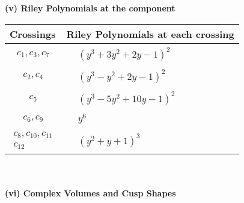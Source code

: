 \documentclass[1p]{elsarticle_modified}
\theoremstyle{definition}
\begin{document}
\newpage\renewcommand{\arraystretch}{1}
\flushleft \textbf{(v) Riley Polynomials at the component}\newline \\
\begin{tabular}{m{50pt}|m{274pt}}
Crossings & \hspace{64pt}Riley Polynomials at each crossing \\
\hline $$\begin{aligned}c_{1},c_{3},c_{7}\end{aligned}$$&$\begin{aligned}
&(y^3+3 y^2+2 y-1)^2
\end{aligned}$\\
\hline $$\begin{aligned}c_{2},c_{4}\end{aligned}$$&$\begin{aligned}
&(y^3- y^2+2 y-1)^2
\end{aligned}$\\
\hline $$\begin{aligned}c_{5}\end{aligned}$$&$\begin{aligned}
&(y^3-5 y^2+10 y-1)^2
\end{aligned}$\\
\hline $$\begin{aligned}c_{6},c_{9}\end{aligned}$$&$\begin{aligned}
&y^6
\end{aligned}$\\
\hline $$\begin{aligned}c_{8},c_{10},c_{11}\\c_{12}\end{aligned}$$&$\begin{aligned}
&(y^2+y+1)^3
\end{aligned}$\\
\hline
\end{tabular}\\~\\
\newpage\flushleft \textbf{(vi) Complex Volumes and Cusp Shapes}
\end{document}
